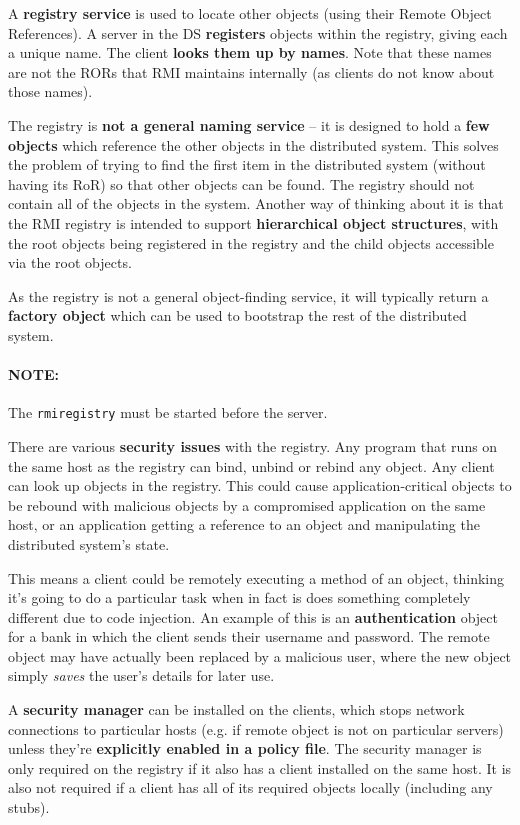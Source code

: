 \documentclass{article}
\begin{document}
A \textbf{registry service} is used to locate other objects (using their Remote Object References). A server in the DS \textbf{registers} objects within the registry, giving each a unique name. The client \textbf{looks them up by names}. Note that these names are not the RORs that RMI  maintains internally (as clients do not know about those names).

The registry is \textbf{not a general naming service} -- it is designed to hold a \textbf{few objects} which reference the other objects in the distributed system. This solves the problem of trying to find the first item in the distributed system (without having its RoR) so that other objects can be found. The registry should not contain all of the objects in the system. Another way of thinking about it is that the RMI registry is intended to support \textbf{hierarchical object structures}, with the root objects being registered in the registry and the child objects accessible via the root objects.

As the registry is not a general object-finding service, it will typically return a \textbf{factory object} which can be used to bootstrap the rest of the distributed system.

\paragraph{\textbf{NOTE: }} The \texttt{rmiregistry} must be started before the server. 

There are various \textbf{security issues} with the registry. Any program that runs on the same host as the registry can bind, unbind or rebind any object. Any client can look up objects in the registry. This could cause application-critical objects to be rebound with malicious objects by a compromised application on the same host, or an application getting a reference to an object and manipulating the distributed system's state.

This means a client could be remotely executing a method of an object, thinking it's going to do a particular task when in fact is does something completely different due to code injection. An example of this is an \textbf{authentication} object for a bank in which the client sends their username and password. The remote object may have actually been replaced by a malicious user, where the new object simply \textit{saves} the user's details for later use.

A \textbf{security manager} can be installed on the clients, which stops network connections to particular hosts (e.g. if remote object is not on particular servers) unless they're \textbf{explicitly enabled in a policy file}. The security manager is only required on the registry if it also has a client installed on the same host. It is also not required if a client has all of its required objects locally (including any stubs). 
\end{document}
